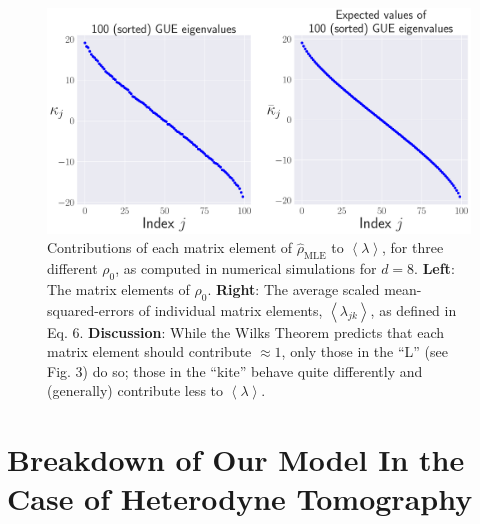 \documentclass[aps,pra, twocolumn]{revtex4}
\newcommand{\expect}[1]{\ensuremath{\left\langle#1\right\rangle}}
\newcommand{\rhohat}{\hat{\rho}}
\newcommand{\rhoMLE}{\rhohat_{\scriptscriptstyle\mathrm{MLE}}}
\begin{document}
\begin{figure}[h!]
\includegraphics[width=\columnwidth]{Images/Figure_7.pdf}
 \caption{Contributions of each matrix element of $\rhoMLE$ to $\expect{\lambda}$, for three different $\rho_0$, as computed in numerical simulations for $d=8$.  \textbf{Left}:  The matrix elements of $\rho_0$.  \textbf{Right}:  The average scaled mean-squared-errors of individual matrix elements, $\expect{\lambda_{jk}}$, as defined in Eq. 6.  \textbf{Discussion}:  While the Wilks Theorem predicts that each matrix element should contribute $\approx1$, only those in the ``L'' (see Fig. 3) do so; those in the ``kite'' behave quite differently and (generally) contribute less to $\expect{\lambda}$.
}
\label{fig:isocontribs}
\end{figure}



\section{Breakdown of Our Model In the Case of Heterodyne Tomography}
\label{app:breakdown}
\end{document}
